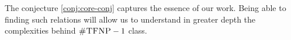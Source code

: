 The conjecture \ref{conj:core-conj} captures the essence of our work. Being
able to finding such relations will allow us to understand in greater depth the complexities
behind $\textnormal{\textsc{\#TFNP}} - 1$ class.


%
%
%
%
%
%
%
%
%
%
%
%
%
%
%
